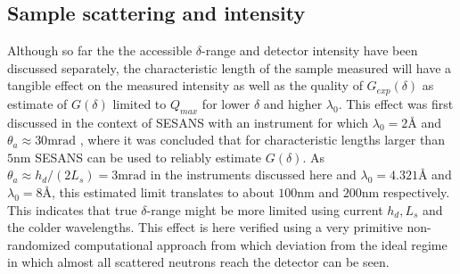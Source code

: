 \documentclass{article}
\begin{document}
\subsection{Sample scattering and intensity}
\label{c4.4}
Although so far the the accessible $\delta$-range and detector intensity have been discussed separately, the characteristic length of the sample measured will have a tangible effect on the measured intensity as well as the quality of $G_{exp}(\delta)$ as estimate of $G(\delta)$ limited to $Q_{max}$ for lower $\delta$ and higher $\lambda_0$. This effect was first discussed in the context of SESANS with an instrument for which $\lambda_0 = 2$Å and $\theta_a \approx 30\unit{\milli\radian}$ \cite{rekveldt1996}, where it was concluded that for characteristic lengths larger than $5\unit{\nano\meter}$ SESANS can be used to reliably estimate $G(\delta)$. As $\theta_a \approx h_d / (2L_s) = 3\unit{\milli\radian}$ in the instruments discussed here and $\lambda_0 = 4.321$Å and $\lambda_0 = 8$Å, this estimated limit translates to about $100 \unit{\nano\meter}$ and $200 \unit{\nano\meter}$ respectively. This indicates that true $\delta$-range might be more limited using current $h_d,L_s$ and the colder wavelengths. This effect is here verified using a very primitive non-randomized computational approach from which deviation from the ideal regime in which almost all scattered neutrons reach the detector \cite{rekveldt1996} can be seen. 
\end{document}
